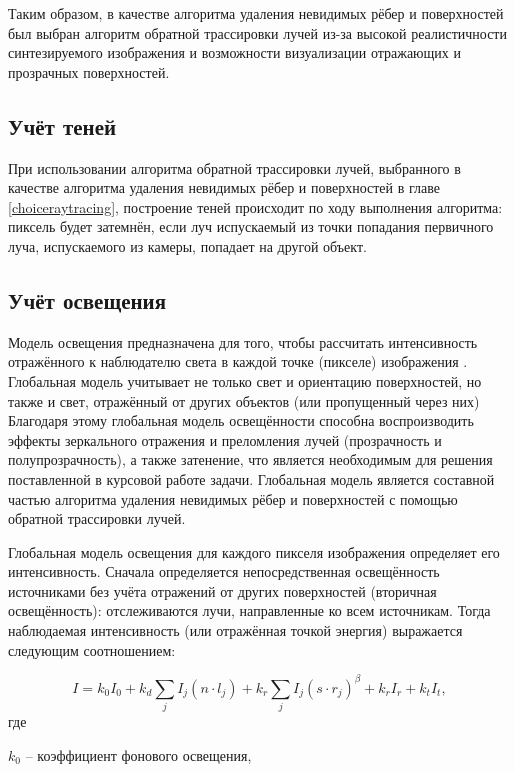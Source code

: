Таким образом, в качестве алгоритма удаления невидимых рёбер и поверхностей был выбран алгоритм обратной трассировки лучей из-за высокой реалистичности синтезируемого изображения и возможности визуализации отражающих и прозрачных поверхностей. 

\subsection{Учёт теней}

При использовании алгоритма обратной трассировки лучей, выбранного в качестве алгоритма удаления невидимых рёбер и поверхностей в главе \ref{choiceraytracing}, построение теней происходит по ходу выполнения алгоритма: пиксель будет затемнён, если луч испускаемый из точки попадания первичного луча, испускаемого из камеры, попадает на другой объект.

\subsection{Учёт освещения}

Модель освещения предназначена для того, чтобы рассчитать интенсивность отражённого к наблюдателю света в каждой точке (пикселе) изображения \cite{rodgers}.  Глобальная модель учитывает не только свет и ориентацию поверхностей, но также и свет, отражённый от других объектов (или пропущенный через них) Благодаря этому глобальная модель освещённости способна воспроизводить эффекты зеркального отражения и преломления лучей (прозрачность и полупрозрачность), а также затенение, что является необходимым для решения поставленной в курсовой работе задачи. Глобальная модель является составной частью алгоритма удаления невидимых рёбер и поверхностей с помощью обратной трассировки лучей.

Глобальная модель освещения для каждого пикселя изображения определяет его интенсивность. Сначала определяется непосредственная освещённость источниками без учёта отражений от других поверхностей (вторичная освещённость): отслеживаются лучи, направленные ко всем источникам. Тогда наблюдаемая интенсивность (или отражённая точкой энергия) выражается следующим соотношением:

\begin{equation}
	I = k_0I_0 + k_d\sum\limits_{j}^{}I_j(n \cdot l_j) + k_r\sum\limits_{j}^{}I_j(s \cdot r_j)^{\beta}+k_rI_r+k_tI_t,
\end{equation}
где

$k_0$ -- коэффициент фонового освещения,

